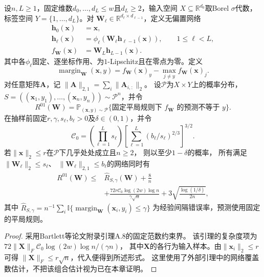 \begin{theorem}[深层网络的谱复杂度与期望风险]
\label{thm:spectral-network-risk}
设$n,L\geq1$，固定维数$d_0,\ldots,d_L\leq w$且$d_L\geq2$，输入空间
$X\subseteq\mathbb R^{d_0}$取Borel $\sigma$代数，标签空间
$Y=\{1,\ldots,d_L\}$。对
$\bm W_\ell\in\mathbb R^{d_\ell\times d_{\ell-1}}$，定义无偏置网络
\[
\begin{aligned}
 \bm h_0(\bm x)&=\bm x,\\
 \bm h_\ell(\bm x)
 &=\phi_\ell(\bm W_\ell\bm h_{\ell-1}(\bm x)),
 \qquad 1\leq\ell<L,\\
 f_{\bm W}(\bm x)&=\bm W_L\bm h_{L-1}(\bm x).
\end{aligned}
\]
其中各$\phi_\ell$固定、逐坐标作用、为$1$-Lipschitz且在零点为零。定义
\[
 \operatorname{margin}_{\bm W}(\bm x,y)
 =f_{\bm W}(\bm x)_y-\max_{j\neq y}f_{\bm W}(\bm x)_j.
\]
对任意矩阵$\bm A$，记
$\|\bm A\|_{2,1}=\sum_i\|\bm A_{i,:}\|_2$。
设$\mathcal P$为$X\times Y$上的概率分布，
$S=((\bm x_1,y_1),\ldots,(\bm x_n,y_n))\sim\mathcal P^n$，并令
\[
 R^{01}(\bm W)
 =\mathbb P_{(\bm x,y)\sim\mathcal P}
   \{\text{固定平局规则下 }f_{\bm W}\text{ 的预测不等于 }y\}.
\]
在抽样前固定$r,\gamma,s_\ell,b_\ell>0$及$\delta\in(0,1)$，并令
\[
 \mathcal C_0=
 \left(\prod_{\ell=1}^L s_\ell\right)
 \left[\sum_{\ell=1}^L(b_\ell/s_\ell)^{2/3}\right]^{3/2}.
\]
若$\|\bm x\|_2\leq r$在$\mathcal P$下几乎处处成立且$n\geq2$，
则以至少$1-\delta$的概率，
所有满足$\|\bm W_\ell\|_2\leq s_\ell$、
$\|\bm W_\ell\|_{2,1}\leq b_\ell$的网络同时有
\begin{equation}
 \begin{aligned}
 R^{01}(\bm W)\leq{}&\hat R_{S,\gamma}(\bm W)+\frac8n\\
 &+\frac{72r\mathcal C_0\log(2w)\log n}{\gamma\sqrt n}
 +3\sqrt{\frac{\log(1/\delta)}{2n}},
 \end{aligned}
 \label{eq:spectral-risk-explicit}
\end{equation}
其中
$\hat R_{S,\gamma}=n^{-1}\sum_i
\mathbb I\{\operatorname{margin}_{\bm W}(\bm x_i,y_i)\leq\gamma\}$
为经验间隔错误率，预测使用固定的平局规则。
\end{theorem}
\begin{proof}
采用Bartlett等论文附录引理A.8的固定范数约束界。
该引理的复杂度项为
$72\|\bm X\|_F\mathcal C_0\log(2w)\log n/(\gamma n)$，
其中$\bm X$的各行为输入样本。由$\|\bm x_i\|_2\leq r$可得
$\|\bm X\|_F\leq r\sqrt n$，代入便得到所述形式。
这里使用了外部引理中的网络覆盖数估计，不把该组合估计视为已在本章证明。
\end{proof}

